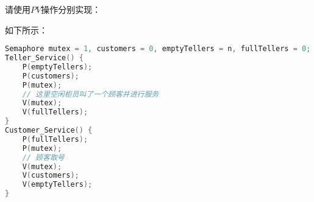 
请使用$PV$操作分别实现：


\begin{solution}

如下所示：

\begin{lstlisting}[language=C]
Semaphore mutex = 1, customers = 0, emptyTellers = n, fullTellers = 0;
Teller_Service() {
    P(emptyTellers);
    P(customers);
    P(mutex);
    // 这里空闲柜员叫了一个顾客并进行服务
    V(mutex);
    V(fullTellers);
}
Customer_Service() {
    P(fullTellers);
    P(mutex);
    // 顾客取号
    V(mutex);
    V(customers);
    V(emptyTellers);
}
\end{lstlisting}

\end{solution}